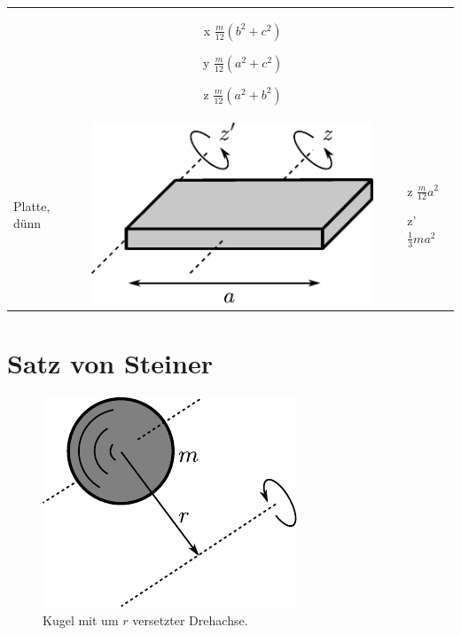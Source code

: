 \begin{table}[h!]
\begin{tabular}{m{2cm} c m{}}
\begin{minipage}{0.3\textwidth}
	\end{minipage} &
		\begin{itemize}
		\item[x] $\frac{m}{12} \left(b^2 + c^2\right)$
		\item[y] $\frac{m}{12} \left(a^2 + c^2\right)$
		\item[z] $\frac{m}{12} \left(a^2 + b^2\right)$
		\end{itemize} \\
Platte, dünn &
	\begin{minipage}{0.3\textwidth}
	\includegraphics[scale=\traegscale]{traeg-platte.pdf}
	\end{minipage} &
		\begin{itemize}
		\item[z] $\frac{m}{12} a^2$
		\item[z'] $\frac{1}{3} ma^2$
		\end{itemize} \\
\end{tabular}
\end{table}

\newpage
\section{Satz von Steiner}

\begin{figure}[h!]
	\centering
	\includegraphics[scale=0.7]{steiner.pdf}
	\caption{Kugel mit um $r$ versetzter Drehachse.}
	\label{fig:steiner}
\end{figure}

